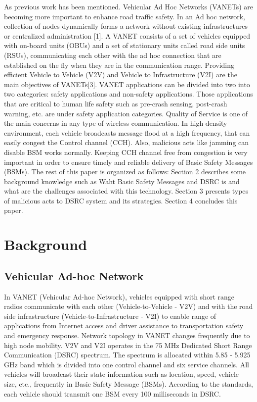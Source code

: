 \documentclass[conference]{IEEEtran}
\begin{document}
As previous work\cite{Last-Work} has been mentioned. Vehicular Ad Hoc Networks (VANETs) are becoming more important to enhance road traffic safety. In an Ad hoc network, collection of nodes dynamically forms a network without existing infrastructures or centralized administration [1]. A VANET consists of a set of vehicles equipped with on-board units (OBUs) and a set of stationary units called road side units (RSUs), communicating each other with the ad hoc connection that are established on the fly when they are in the communication range. Providing efficient Vehicle to Vehicle (V2V) and Vehicle to Infrastructure (V2I) are the main objectives of VANETs[3]. VANET applications can be divided into two into two categories: safety applications and non-safety applications. Those applications that are critical to human life safety such as pre-crash sensing, post-crash warning, etc. are under safety application categories. Quality of Service is one of the main concerns in any type of wireless communication. In high density environment, each vehicle broadcasts message flood at a high frequency, that can easily congest the Control channel (CCH). Also, malicious acts like jamming can disable BSM works normally. Keeping CCH channel free from congestion is very important in order to ensure timely and reliable delivery of Basic Safety Messages (BSMs). The rest of this paper is organized as follows: Section 2 describes some background knowledge such as Waht Basic Safety Messages and DSRC is and what are the challenges associated with this technology. Section 3 presents types of malicious acts to DSRC system and its strategies. Section 4 concludes this paper.


\section{Background}
\subsection{Vehicular Ad-hoc Network}
In VANET (Vehicular Ad-hoc Network), vehicles equipped with short range radios communicate with each other (Vehicle-to-Vehicle - V2V) and with the road side infrastructure (Vehicle-to-Infrastructure - V2I) to enable range of applications from Internet access and driver assistance to transportation safety and emergency response. Network topology in VANET changes frequently due to high node mobility. V2V and V2I operates in the 75 MHz Dedicated Short Range Communication (DSRC) spectrum. The spectrum is allocated within 5.85 - 5.925 GHz band which is divided into one control channel and six service channels. All vehicles will broadcast their state information such as location, speed, vehicle size, etc., frequently in Basic Safety Message (BSMs). According to the standards, each vehicle should transmit one BSM every 100 milliseconds in DSRC.
\end{document}

